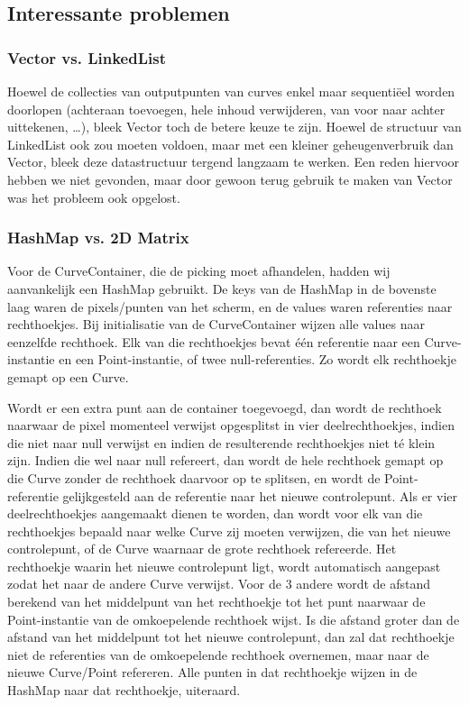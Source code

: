\documentclass[a4paper,11pt,oneside, titlepage]{article}
\begin{document}
\subsection{Interessante problemen}
\subsubsection{Vector vs. LinkedList}
Hoewel de collecties van outputpunten van curves enkel maar sequenti\"eel worden doorlopen (achteraan toevoegen, hele inhoud verwijderen, van voor naar achter uittekenen, \ldots), bleek Vector toch de betere keuze te zijn.
Hoewel de structuur van LinkedList ook zou moeten voldoen, maar met een kleiner geheugenverbruik dan Vector, bleek deze datastructuur tergend langzaam te werken. Een reden hiervoor hebben we niet gevonden, maar door gewoon terug gebruik te maken van Vector was het probleem ook opgelost.
\subsubsection{HashMap vs. 2D Matrix}
Voor de CurveContainer, die de picking moet afhandelen, hadden wij aanvankelijk een HashMap gebruikt. De keys van de HashMap in de bovenste laag waren de pixels/punten van het scherm, en de values waren referenties naar rechthoekjes. Bij initialisatie van de CurveContainer wijzen alle values naar eenzelfde rechthoek. Elk van die rechthoekjes bevat \'e\'en referentie naar een Curve-instantie en een Point-instantie, of twee null-referenties. Zo wordt elk rechthoekje gemapt op een Curve.

Wordt er een extra punt aan de container toegevoegd, dan wordt de rechthoek naarwaar de pixel momenteel verwijst opgesplitst in vier deelrechthoekjes, indien die niet naar null verwijst en indien de resulterende rechthoekjes niet t\'e klein zijn. Indien die wel naar null refereert, dan wordt de hele rechthoek gemapt op die Curve zonder de rechthoek daarvoor op te splitsen, en wordt de Point-referentie gelijkgesteld aan de referentie naar het nieuwe controlepunt. Als er vier deelrechthoekjes aangemaakt dienen te worden, dan wordt voor elk van die rechthoekjes bepaald naar welke Curve zij moeten verwijzen, die van het nieuwe controlepunt, of de Curve waarnaar de grote rechthoek refereerde. Het rechthoekje waarin het nieuwe controlepunt ligt, wordt automatisch aangepast zodat het naar de andere Curve verwijst. Voor de 3 andere wordt de afstand berekend van het middelpunt van het rechthoekje tot het punt naarwaar de Point-instantie van de omkoepelende rechthoek wijst. Is die afstand groter dan de afstand van het middelpunt tot het nieuwe controlepunt, dan zal dat rechthoekje niet de referenties van de omkoepelende rechthoek overnemen, maar naar de nieuwe Curve/Point refereren.
Alle punten in dat rechthoekje wijzen in de HashMap naar dat rechthoekje, uiteraard.
\end{document}
